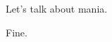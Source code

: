 \label{ally:11}
\begin{paracol}{2}
  \begin{leftcolumn}

\null
\vfill
\begin{ally}
Let's talk about mania.
\end{ally}
Fine.
\vfill
\newpage

\end{leftcolumn}
\end{paracol}
